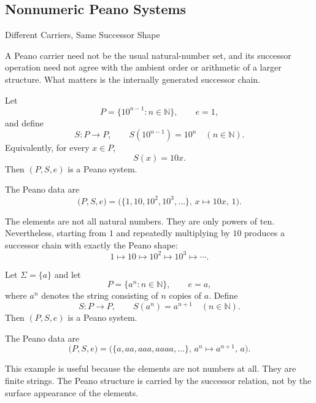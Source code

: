 \subsection*{Nonnumeric Peano Systems}

\begin{topicbox}{Different Carriers, Same Successor Shape}
\begin{exposition}
A Peano carrier need not be the usual natural-number set, and its successor
operation need not agree with the ambient order or arithmetic of a larger
structure. What matters is the internally generated successor chain.
\end{exposition}

\begin{example*}
Let
\[
P=\{10^{n-1}:n\in\mathbb{N}\}, \qquad e=1,
\]
and define
\[
S:P\to P,
\qquad
S(10^{n-1})=10^n
\quad(n\in\mathbb{N}).
\]
Equivalently, for every $x\in P$,
\[
S(x)=10x.
\]
Then $(P,S,e)$ is a Peano system.
\end{example*}

\begin{remark*}[Structure]
The Peano data are
\[
\bigl(P,S,e\bigr)
=
\bigl(\{1,10,10^2,10^3,\ldots\},\,x\mapsto 10x,\,1\bigr).
\]
\end{remark*}

\begin{remark*}[Interpretation]
The elements are not all natural numbers. They are only powers of ten.
Nevertheless, starting from $1$ and repeatedly multiplying by $10$ produces a
successor chain with exactly the Peano shape:
\[
1 \mapsto 10 \mapsto 10^2 \mapsto 10^3 \mapsto \cdots.
\]
\end{remark*}

\begin{example*}
Let $\Sigma=\{a\}$ and let
\[
P=\{a^n:n\in\mathbb{N}\}, \qquad e=a,
\]
where $a^n$ denotes the string consisting of $n$ copies of $a$. Define
\[
S:P\to P,
\qquad
S(a^n)=a^{n+1}
\quad(n\in\mathbb{N}).
\]
Then $(P,S,e)$ is a Peano system.
\end{example*}

\begin{remark*}[Structure]
The Peano data are
\[
\bigl(P,S,e\bigr)
=
\bigl(\{a,aa,aaa,aaaa,\ldots\},\,a^n\mapsto a^{n+1},\,a\bigr).
\]
\end{remark*}

\begin{remark*}[Interpretation]
This example is useful because the elements are not numbers at all. They are
finite strings. The Peano structure is carried by the successor relation, not
by the surface appearance of the elements.
\end{remark*}


\end{topicbox}
